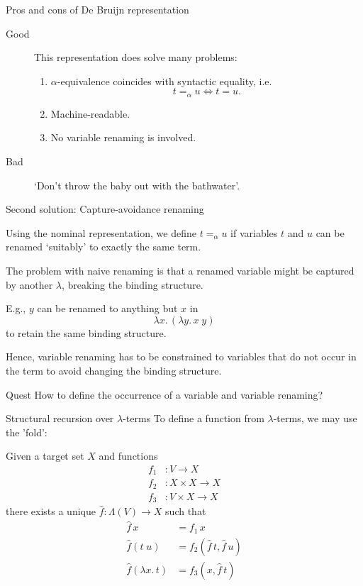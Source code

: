 \begin{frame}{Pros and cons of De Bruijn representation}
   
  \begin{description}
    \item[Good] This representation does solve many problems:
      \begin{enumerate}
        \item $\alpha$-equivalence coincides with syntactic equality, i.e.
          \[
            t =_\alpha u \iff t = u.
          \]
        \item Machine-readable.
        \item No variable renaming is involved.
      \end{enumerate}
    \item[Bad] `Don't throw the baby out with the bathwater'.
  \end{description}
\end{frame}

\begin{frame}{Second solution: Capture-avoidance renaming}
  \begin{idea}
    Using the nominal representation, we define $t =_\alpha u$ if variables $t$ and $u$ can be renamed `suitably' to exactly the same term.
  \end{idea}
  The problem with naive renaming is that a renamed variable might be \alert{captured} by another $\lambda$, breaking the binding structure.

  E.g., $y$ can be renamed to anything but $x$ in 
  \[
    \lambda x.\,(\lambda y.\, x \; y)
  \]
  to retain the same binding structure.

  Hence, variable renaming has to be constrained to variables that do not \alert{occur} in the term to avoid changing the binding structure.
  \begin{alertblock}{Quest}
    How to define the \alert{occurrence} of a variable and variable \alert{renaming}?
  \end{alertblock}
\end{frame}

\begin{frame}{Structural recursion over $\lambda$-terms}
  To define a function from $\lambda$-terms, we may use the '\alert{fold}':

  \begin{theorem*}
    Given a target set $X$ and functions
    \begin{align*}
      f_1 & \colon V \to X \\
      f_2 & \colon X \times X \to X \\
      f_3 & \colon V \times X \to X
    \end{align*}
    there exists a unique $\hat{f}\colon \Lambda(V)  \to X$ such that
    \begin{align*}
      \hat{f}\,x    & = f_1\,x \\
      \hat{f}(t\;u) & = f_2(\hat{f}\,t, \hat{f}\,u) \\
      \hat{f}(\lambda x.\, t) & = f_3(x, \hat{f}\,t)
    \end{align*}
  \end{theorem*}
\end{frame}

